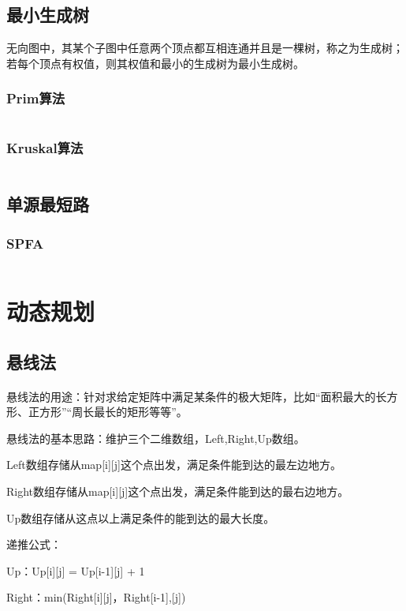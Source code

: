 \documentclass[a4paper,11pt]{article}
\begin{document}
\subsection{最小生成树} %
无向图中，其某个子图中任意两个顶点都互相连通并且是一棵树，称之为生成树；若每个顶点有权值，则其权值和最小的生成树为最小生成树。
\subsubsection{Prim算法}
\inputminted[breaklines,linenos,frame=leftline]{c++}{graph/prim.cpp}
\subsubsection{Kruskal算法} %
\inputminted[breaklines,linenos,frame=leftline]{c++}{graph/kruskal.cpp}
\subsection{单源最短路}
\subsubsection{SPFA}
\inputminted[breaklines]{c++}{graph/spfa.cc}
\newpage
\section{动态规划}
\subsection{悬线法}
\paragraph{}
悬线法的用途：针对求给定矩阵中满足某条件的极大矩阵，比如“面积最大的长方形、正方形”“周长最长的矩形等等”。

悬线法的基本思路：维护三个二维数组，Left,Right,Up数组。

Left数组存储从map[i][j]这个点出发，满足条件能到达的最左边地方。

Right数组存储从map[i][j]这个点出发，满足条件能到达的最右边地方。

Up数组存储从这点以上满足条件的能到达的最大长度。

递推公式：

Up：Up[i][j] = Up[i-1][j] + 1

Right：min(Right[i][j]，Right[i-1],[j])
\end{document}
